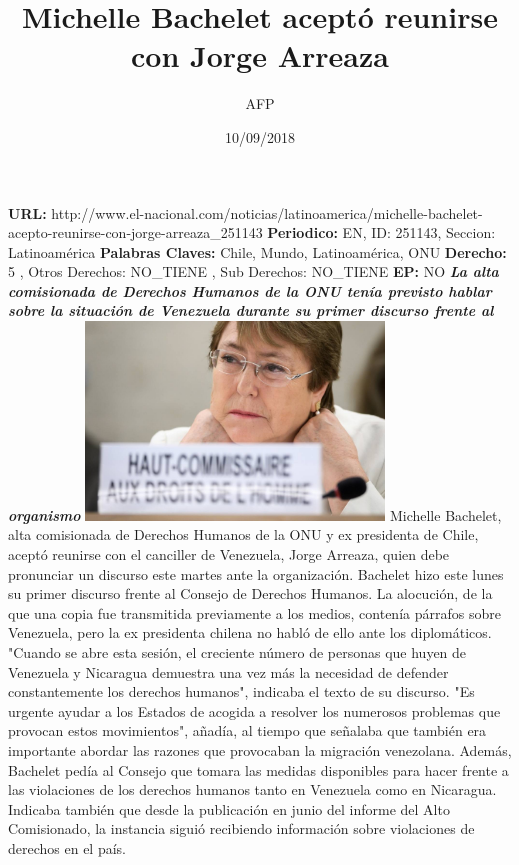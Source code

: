 \documentclass{article}%
\title{\textbf{Michelle Bachelet aceptó reunirse con Jorge Arreaza}}%
\author{AFP}%
\date{10/09/2018}%
\begin{document}
%
\normalsize%
\maketitle%
\textbf{URL: }%
http://www.el{-}nacional.com/noticias/latinoamerica/michelle{-}bachelet{-}acepto{-}reunirse{-}con{-}jorge{-}arreaza\_251143\newline%
%
\textbf{Periodico: }%
EN, %
ID: %
251143, %
Seccion: %
Latinoamérica\newline%
%
\textbf{Palabras Claves: }%
Chile, Mundo, Latinoamérica, ONU\newline%
%
\textbf{Derecho: }%
5%
, Otros Derechos: %
NO\_TIENE%
, Sub Derechos: %
NO\_TIENE%
\newline%
%
\textbf{EP: }%
NO\newline%
\newline%
%
\textbf{\textit{La alta comisionada de Derechos Humanos de la ONU tenía previsto hablar sobre la situación de Venezuela durante su primer discurso frente al organismo}}%
\newline%
\newline%
%
\includegraphics[width=300px]{203.jpg}%
\newline%
%
Michelle Bachelet, alta comisionada de Derechos Humanos de la ONU y ex presidenta de Chile, aceptó reunirse con el canciller de Venezuela, Jorge Arreaza, quien debe pronunciar un discurso este martes ante la organización.%
\newline%
%
Bachelet hizo este lunes su primer discurso frente al Consejo de Derechos Humanos. La alocución, de la que una copia fue transmitida previamente a los medios, contenía párrafos sobre Venezuela, pero la ex presidenta chilena no habló de ello ante los diplomáticos.%
\newline%
%
"Cuando se abre esta sesión, el creciente número de personas que huyen de Venezuela y Nicaragua demuestra una vez más la necesidad de defender constantemente los derechos humanos", indicaba el texto de su discurso.%
\newline%
%
"Es urgente ayudar a los Estados de acogida a resolver los numerosos problemas que provocan estos movimientos", añadía, al tiempo que señalaba que también era importante abordar las razones que provocaban la migración venezolana.%
\newline%
%
Además, Bachelet pedía al Consejo que tomara las medidas disponibles para hacer frente a las violaciones de los derechos humanos tanto en Venezuela como en Nicaragua.%
\newline%
%
Indicaba también que desde la publicación en junio del informe del Alto Comisionado, la instancia siguió recibiendo información sobre violaciones de derechos en el país.%
\newline%
%
\end{document}
